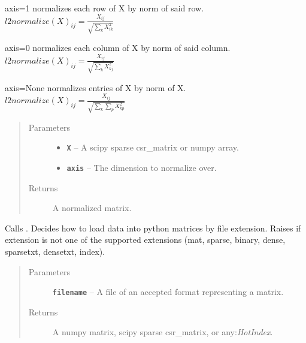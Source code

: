 \documentclass[letterpaper,10pt,english]{sphinxmanual}
\begin{document}
\begin{fulllineitems}
\label{loader:loader.l2normalize}
axis=1 normalizes each row of X by norm of said row. \(l2normalize(X)_{ij} = \frac{X_{ij}}{\sqrt{\sum_k X_{
ik}^2}}\)

axis=0 normalizes each column of X by norm of said column. \(l2normalize(X)_{ij} = \frac{X_{ij}}{\sqrt{\sum_k
X_{kj}^2}}\)

axis=None normalizes entries of X  by norm of X. \(l2normalize(X)_{ij} = \frac{X_{ij}}{\sqrt{\sum_k \sum_p
X_{kp}^2}}\)
\begin{quote}\begin{description}
\item[{Parameters}] \leavevmode\begin{itemize}
\item {} 
\textbf{\texttt{X}} -- A scipy sparse csr\_matrix or numpy array.

\item {} 
\textbf{\texttt{axis}} -- The dimension to normalize over.

\end{itemize}

\item[{Returns}] \leavevmode
A normalized matrix.

\end{description}\end{quote}

\end{fulllineitems}


\begin{fulllineitems}
\label{loader:loader.load}
Calls {\hyperref[loader:loader.import_data]{\emph{}}}.
Decides how to load data into python matrices by file extension.
Raises {\hyperref[loader:loader.Unsupported_format_error]{\emph{}}} if extension is not one of the supported
extensions (mat, sparse, binary, dense, sparsetxt, densetxt, index).
\begin{quote}\begin{description}
\item[{Parameters}] \leavevmode
\textbf{\texttt{filename}} -- A file of an accepted format representing a matrix.

\item[{Returns}] \leavevmode
A numpy matrix, scipy sparse csr\_matrix, or any:\emph{HotIndex}.

\end{description}\end{quote}

\end{fulllineitems}
\end{document}
